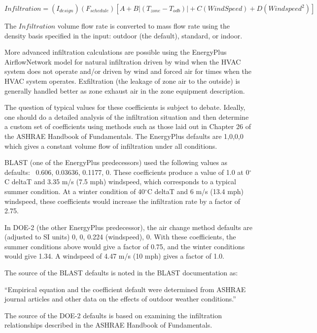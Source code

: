 \begin{equation}
Infiltration = \left( {{I_{design}}} \right)\left( {{F_{schedule}}} \right)\left[ {A + B\left| {\left( {{T_{zone}} - {T_{odb}}} \right)} \right| + C\left( {WindSpeed} \right) + D\left( {Windspee{d^2}} \right)} \right]
\end{equation}

The $Infiltration$ volume flow rate is converted to mass flow rate using the density basis specified in the input: outdoor (the default), standard, or indoor.

More advanced infiltration calculations are possible using the EnergyPlus AirflowNetwork model for natural infiltration driven by wind when the HVAC system does not operate and/or driven by wind and forced air for times when the HVAC system operates. Exfiltration (the leakage of zone air to the outside) is generally handled better as zone exhaust air in the zone equipment description.

The question of typical values for these coefficients is subject to debate. Ideally, one should do a detailed analysis of the infiltration situation and then determine a custom set of coefficients using methods such as those laid out in Chapter 26 of the ASHRAE Handbook of Fundamentals. The EnergyPlus defaults are 1,0,0,0 which gives a constant volume flow of infiltration under all conditions.

BLAST (one of the EnergyPlus predecessors) used the following values as defaults:~ 0.606, 0.03636, 0.1177, 0. These coefficients produce a value of 1.0 at 0$^{\circ}$C deltaT and 3.35 m/s (7.5 mph) windspeed, which corresponds to a typical summer condition. At a winter condition of 40$^{\circ}$C deltaT and 6 m/s (13.4 mph) windspeed, these coefficients would increase the infiltration rate by a factor of 2.75.

In DOE-2 (the other EnergyPlus predecessor), the air change method defaults are (adjusted to SI units) 0, 0, 0.224 (windspeed), 0. With these coefficients, the summer conditions above would give a factor of 0.75, and the winter conditions would give 1.34. A windspeed of 4.47 m/s (10 mph) gives a factor of 1.0.

The source of the BLAST defaults is noted in the BLAST documentation as:

``Empirical equation and the coefficient default were determined from ASHRAE journal articles and other data on the effects of outdoor weather conditions.''

The source of the DOE-2 defaults is based on examining the infiltration relationships described in the ASHRAE Handbook of Fundamentals.


